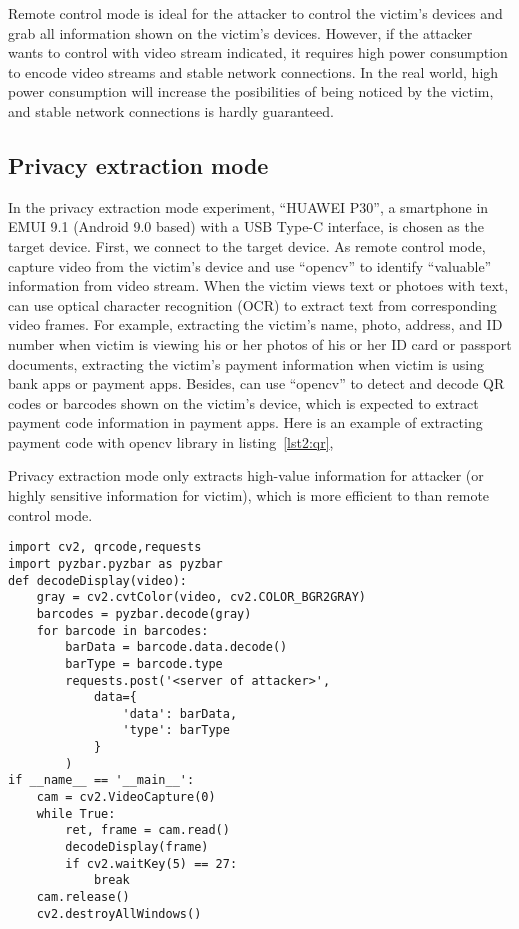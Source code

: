 Remote control mode is ideal for the attacker to control the victim's devices and grab all information shown on the victim's devices. However, if the attacker wants to control with video stream indicated, it requires high power consumption to encode video streams and stable network connections. In the real world, high power consumption will increase the posibilities of being noticed by the victim, and stable network connections is hardly guaranteed.


\subsection{Privacy extraction mode}

In the privacy extraction mode experiment, ``HUAWEI P30'', a smartphone in EMUI 9.1 (Android 9.0 based) with a USB Type-C interface, is chosen as the target device. First, we connect \tool to the target device. As remote control mode, \tool capture video from the victim's device and use ``opencv'' to identify ``valuable'' information from video stream. When the victim views text or photoes with text, \tool can use optical character recognition (OCR) to extract text from corresponding video frames. 
For example, extracting the victim's name, photo, address, and ID number when victim is viewing his or her photos of his or her ID card or passport documents,
extracting the victim's payment information when victim is using bank apps or payment apps. Besides, \tool can use ``opencv'' to detect and decode QR codes or barcodes shown on the victim's device, which is expected to extract payment code information in payment apps.
Here is an example of extracting payment code with opencv library in listing~\ref{lst2:qr},

Privacy extraction mode only extracts high-value information for attacker (or highly sensitive information for victim), which is more efficient to  than remote control mode.

\begin{lstlisting}[caption={python script for extracting payment code of victim},label=lst2:qr]
import cv2, qrcode,requests
import pyzbar.pyzbar as pyzbar
def decodeDisplay(video):
    gray = cv2.cvtColor(video, cv2.COLOR_BGR2GRAY)
    barcodes = pyzbar.decode(gray)
    for barcode in barcodes:
        barData = barcode.data.decode()
        barType = barcode.type
        requests.post('<server of attacker>',
            data={
                'data': barData,
                'type': barType
            }
        )
if __name__ == '__main__':
    cam = cv2.VideoCapture(0)
    while True:
        ret, frame = cam.read()
        decodeDisplay(frame)
        if cv2.waitKey(5) == 27:
            break
    cam.release()
    cv2.destroyAllWindows()
\end{lstlisting}



